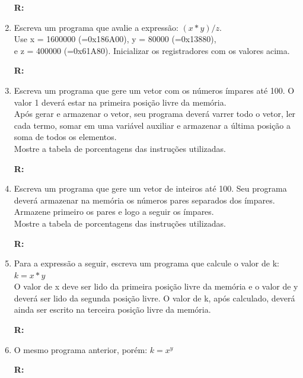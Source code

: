 \documentclass[a4paper,11pt,fleqn]{article}
\begin{document}
\begin{enumerate}
        \textbf{R:}
        
        \newpage

    \item{Escreva um programa que avalie a expressão: $(x*y)/z$.\\Use x = 1600000 (=0x186A00), y = 80000
            (=0x13880), \\e z = 400000 (=0x61A80). Inicializar os registradores com os valores acima.}

        \textbf{R:}
        
        \newpage

    \item{Escreva um programa que gere um vetor com os números ímpares até 100. O valor 1 deverá estar na
            primeira posição livre da memória.\\Após gerar e armazenar o vetor, seu programa deverá varrer
            todo o vetor, ler cada termo, somar em uma variável auxiliar e armazenar a última posição a
            soma de todos os elementos.\\Mostre a tabela de porcentagens das instruções utilizadas.}

        \textbf{R:}
        
        \newpage

    \item{Escreva um programa que gere um vetor de inteiros até 100. Seu programa deverá armazenar na
            memória os números pares separados dos ímpares. Armazene primeiro os pares e logo a seguir os
            ímpares.\\Mostre a tabela de porcentagens das instruções utilizadas.}

        \textbf{R:}
        
        \newpage

    \item{Para a expressão a seguir, escreva um programa que calcule o valor de k: $k = x * y$\\O valor de x
            deve ser lido da primeira posição livre da memória e o valor de y deverá ser lido da segunda
            posição livre. O valor de k, após calculado, deverá ainda ser escrito na terceira posição
            livre da memória.}

        \textbf{R:}
        

    \item{O mesmo programa anterior, porém: $ k = x^y $}

        \textbf{R:}
        
\end{enumerate}
\end{document}
